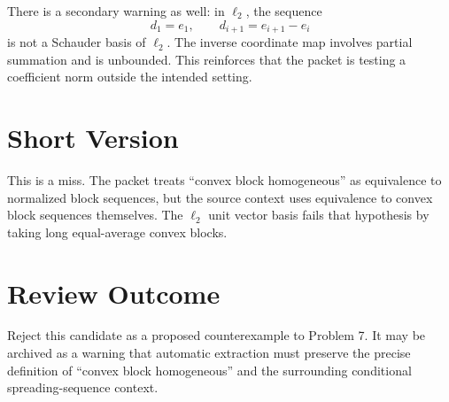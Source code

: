 \documentclass[11pt]{article}
\begin{document}
There is a secondary warning as well: in \(\ell_2\), the sequence
\[
  d_1=e_1,\qquad d_{i+1}=e_{i+1}-e_i
\]
is not a Schauder basis of \(\ell_2\).  The inverse coordinate map involves
partial summation and is unbounded.  This reinforces that the packet is testing
a coefficient norm outside the intended setting.

\section*{Short Version}

This is a miss.  The packet treats ``convex block homogeneous'' as equivalence
to normalized block sequences, but the source context uses equivalence to
convex block sequences themselves.  The \(\ell_2\) unit vector basis fails that
hypothesis by taking long equal-average convex blocks.

\section*{Review Outcome}

Reject this candidate as a proposed counterexample to Problem 7.  It may be
archived as a warning that automatic extraction must preserve the precise
definition of ``convex block homogeneous'' and the surrounding conditional
spreading-sequence context.
\end{document}
